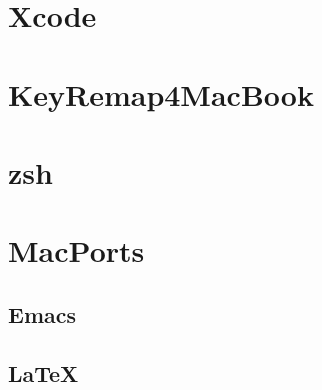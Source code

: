 \section{Xcode}
\section{KeyRemap4MacBook}
\section{zsh}
\section{MacPorts}
\subsection{Emacs}
\subsection{\LaTeX}

